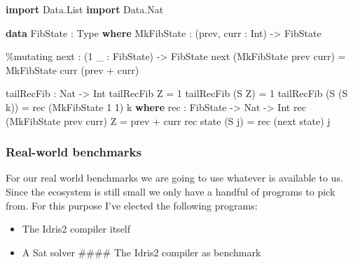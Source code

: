 \documentclass[
]{article}
\newenvironment{Shaded}{}{}
\newcommand{\DataTypeTok}[1]{\textcolor[rgb]{0.56,0.13,0.00}{#1}}
\newcommand{\DecValTok}[1]{\textcolor[rgb]{0.25,0.63,0.44}{#1}}
\newcommand{\KeywordTok}[1]{\textcolor[rgb]{0.00,0.44,0.13}{\textbf{#1}}}
\newcommand{\NormalTok}[1]{#1}
\newcommand{\OperatorTok}[1]{\textcolor[rgb]{0.40,0.40,0.40}{#1}}
\newcommand{\OtherTok}[1]{\textcolor[rgb]{0.00,0.44,0.13}{#1}}
\providecommand{\tightlist}{%
  \setlength{\itemsep}{0pt}\setlength{\parskip}{0pt}}
\begin{document}
\begin{Shaded}
\begin{Highlighting}[]
\KeywordTok{import} \DataTypeTok{Data.List}
\KeywordTok{import} \DataTypeTok{Data.Nat}

\KeywordTok{data} \DataTypeTok{FibState} \OperatorTok{:} \DataTypeTok{Type} \KeywordTok{where}
  \DataTypeTok{MkFibState} \OperatorTok{:}\NormalTok{ (prev, curr }\OperatorTok{:}  \DataTypeTok{Int}\NormalTok{) }\OtherTok{{-}\textgreater{}} \DataTypeTok{FibState}

\OperatorTok{\%}\NormalTok{mutating}
\NormalTok{next }\OperatorTok{:}\NormalTok{ (}\DecValTok{1}\NormalTok{ \_ }\OperatorTok{:} \DataTypeTok{FibState}\NormalTok{) }\OtherTok{{-}\textgreater{}} \DataTypeTok{FibState}
\NormalTok{next (}\DataTypeTok{MkFibState}\NormalTok{ prev curr) }\OtherTok{=} \DataTypeTok{MkFibState}\NormalTok{ curr (prev }\OperatorTok{+}\NormalTok{ curr)}


\NormalTok{tailRecFib }\OperatorTok{:} \DataTypeTok{Nat} \OtherTok{{-}\textgreater{}} \DataTypeTok{Int}
\NormalTok{tailRecFib }\DataTypeTok{Z} \OtherTok{=} \DecValTok{1}
\NormalTok{tailRecFib (}\DataTypeTok{S} \DataTypeTok{Z}\NormalTok{) }\OtherTok{=} \DecValTok{1}
\NormalTok{tailRecFib (}\DataTypeTok{S}\NormalTok{ (}\DataTypeTok{S}\NormalTok{ k)) }\OtherTok{=}\NormalTok{ rec (}\DataTypeTok{MkFibState} \DecValTok{1} \DecValTok{1}\NormalTok{) k}
  \KeywordTok{where}
\NormalTok{    rec }\OperatorTok{:} \DataTypeTok{FibState} \OtherTok{{-}\textgreater{}} \DataTypeTok{Nat} \OtherTok{{-}\textgreater{}} \DataTypeTok{Int}
\NormalTok{    rec (}\DataTypeTok{MkFibState}\NormalTok{ prev curr) }\DataTypeTok{Z} \OtherTok{=}\NormalTok{ prev }\OperatorTok{+}\NormalTok{ curr}
\NormalTok{    rec state (}\DataTypeTok{S}\NormalTok{ j) }\OtherTok{=}\NormalTok{ rec (next state) j}
\end{Highlighting}
\end{Shaded}

\hypertarget{real-world-benchmarks}{%
\subsubsection{Real-world benchmarks}\label{real-world-benchmarks}}

For our real world benchmarks we are going to use whatever is available
to us. Since the ecosystem is still small we only have a handful of
programs to pick from. For this purpose I've elected the following
programs:

\begin{itemize}
\tightlist
\item
  The Idris2 compiler itself
\item
  A Sat solver \#\#\#\# The Idris2 compiler as benchmark
\end{itemize}
\end{document}
